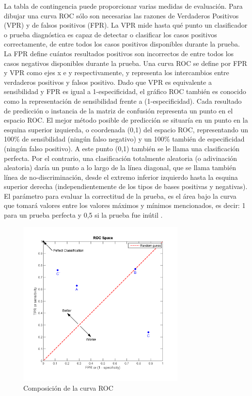 La tabla de contingencia puede proporcionar varias medidas de evaluaci\'on. Para dibujar una curva ROC s\'olo son necesarias las razones de Verdaderos Positivos (VPR) y de falsos positivos (FPR). La VPR mide hasta qu\'e punto un clasificador o prueba diagn\'ostica es capaz de detectar o clasificar los casos positivos correctamente, de entre todos los casos positivos disponibles durante la prueba. La FPR define cu\'antos resultados positivos son incorrectos de entre todos los casos negativos disponibles durante la prueba.
Una curva ROC se define por FPR y VPR como ejes x e y respectivamente, y representa los intercambios entre verdaderos positivos y falsos positivo. Dado que VPR es equivalente a sensibilidad y FPR es igual a 1-especificidad, el gr\'afico ROC tambi\'en es conocido como la representaci\'on de sensibilidad frente a (1-especificidad). Cada resultado de predicci\'on o instancia de la matriz de confusi\'on representa un punto en el espacio ROC.
El mejor m\'etodo posible de predicci\'on se situar\'ia en un punto en la esquina superior izquierda, o coordenada (0,1) del espacio ROC, representando un 100\% de sensibilidad (ning\'un falso negativo) y un 100\% tambi\'en de especificidad (ning\'un falso positivo). A este punto (0,1) tambi\'en se le llama una clasificaci\'on perfecta. Por el contrario, una clasificaci\'on totalmente aleatoria (o adivinaci\'on aleatoria) dar\'ia un punto a lo largo de la l\'inea diagonal, que se llama tambi\'en l\'inea de no-discriminaci\'on, desde el extremo inferior izquierdo hasta la esquina superior derecha (independientemente de los tipos de bases positivas y negativas). El par\'ametro para evaluar la correctitud de la prueba, es el \'area bajo la curva que tomar\'a valores entre los valores m\'aximos y m\'inimos mencionados, es decir: 1  para un prueba perfecta y 0,5 si la prueba fue in\'util 
\cite{wiki:curvaROC}.

\begin{figure}[H]
	{
	\centering
	\includegraphics[width=0.75\textwidth]{Figures/CurvaROC}
	\caption[Curva ROC]{Composici\'on de la curva ROC}
	\label{fig:Composici\'on de la curva ROC}
	}
\end{figure}


